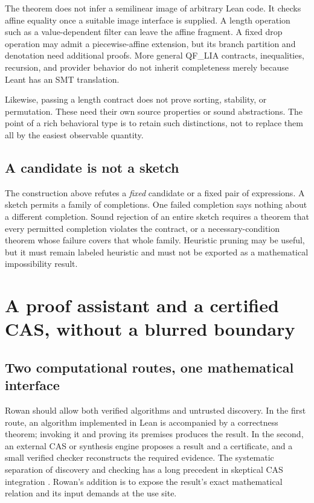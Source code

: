 \documentclass[11pt,letterpaper]{article}
\theoremstyle{definition}\newtheorem{definition}[theorem]{Definition}
\theoremstyle{remark}\newtheorem{remark}[theorem]{Remark}
\begin{document}
The theorem does not infer a semilinear image of arbitrary Lean code. It
checks affine equality once a suitable image interface is supplied. A length
operation such as a value-dependent filter can leave the affine fragment.
A fixed drop operation may admit a piecewise-affine extension, but its branch
partition and denotation need additional proofs. More general QF\_LIA
contracts, inequalities, recursion, and provider behavior do not inherit
completeness merely because Leant has an SMT translation.

Likewise, passing a length contract does not prove sorting, stability, or
permutation. These need their own source properties or sound abstractions.
The point of a rich behavioral type is to retain such distinctions, not to
replace them all by the easiest observable quantity.

\subsection{A candidate is not a sketch}
The construction above refutes a \emph{fixed} candidate or a fixed pair of
expressions. A sketch permits a family of completions. One failed completion
says nothing about a different completion. Sound rejection of an entire sketch
requires a theorem that every permitted completion violates the contract,
or a necessary-condition theorem whose failure covers that whole family.
Heuristic pruning may be useful, but it must remain labeled heuristic and
must not be exported as a mathematical impossibility result.

\section{A proof assistant and a certified CAS, without a blurred boundary}
\label{sec:cas}

\subsection{Two computational routes, one mathematical interface}
Rowan should allow both verified algorithms and untrusted discovery. In the
first route, an algorithm implemented in Lean is accompanied by a correctness
theorem; invoking it and proving its premises produces the result. In the
second, an external CAS or synthesis engine proposes a result and a
certificate, and a small verified checker reconstructs the required evidence.
The systematic separation of discovery and checking has a long precedent in
skeptical CAS integration \cite{skeptic}. Rowan's addition is to expose the
result's exact mathematical relation and its input demands at the use site.
\end{document}
